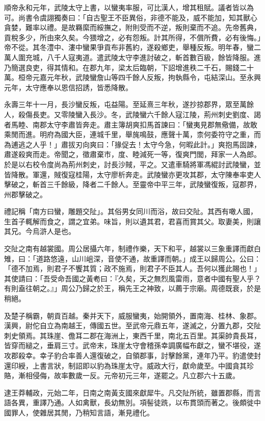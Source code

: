 \begin{pinyinscope}
順帝永和元年，武陵太守上書，以蠻夷率服，可比漢人，增其租賦。議者皆以為可。尚書令虞詡獨奏曰：「自古聖王不臣異俗，非德不能及，威不能加，知其獸心貪婪，難率以禮。是故羇縻而綏撫之，附則受而不逆，叛則棄而不追。先帝舊典，貢稅多少，所由來久矣。今猥增之，必有怨叛。計其所得，不償所費，必有後悔。」帝不從。其冬澧中、漊中蠻果爭貢布非舊約，遂殺鄉吏，舉種反叛。明年春，蠻二萬人圍充城，八千人寇夷道。遣武陵太守李進討破之，斬首數百級，餘皆降服。進乃簡選良吏，得其情和。在郡九年，梁太后臨朝，下詔增進秩二千石，賜錢二十萬。桓帝元嘉元年秋，武陵蠻詹山等四千餘人反叛，拘執縣令，屯結深山。至永興元年，太守應奉以恩信招誘，皆悉降散。

永壽三年十一月，長沙蠻反叛，屯益陽。至延熹三年秋，遂抄掠郡界，眾至萬餘人，殺傷長吏。又零陵蠻入長沙。冬，武陵蠻六千餘人寇江陵，荊州刺史劉度、謁者馬睦、南郡太守李肅皆奔走。肅主簿胡爽扣馬首諫曰：「蠻夷見郡無儆備，故敢乘閒而進。明府為國大臣，連城千里，舉旄鳴鼓，應聲十萬，柰何委符守之重，而為逋逃之人乎！」肅拔刃向爽曰：「掾促去！太守今急，何暇此計。」爽抱馬固諫，肅遂殺爽而走。帝聞之，徵肅棄巿，度、睦減死一等，復爽門閭，拜家一人為郎。於是以右校令度尚為荊州刺史，討長沙賊，平之。又遣車騎將軍馮緄討武陵蠻，並皆降散。軍還，賊復寇桂陽，太守廖析奔走。武陵蠻亦更攻其郡，太守陳奉率吏人擊破之，斬首三千餘級，降者二千餘人。至靈帝中平三年，武陵蠻復叛，寇郡界，州郡擊破之。

禮記稱「南方曰蠻，雕題交阯」。其俗男女同川而浴，故曰交阯。其西有噉人國，生首子輒解而食之，謂之宜弟。味旨，則以遺其君，君喜而賞其父。取妻美，則讓其兄。今烏滸人是也。

交阯之南有越裳國。周公居攝六年，制禮作樂，天下和平，越裳以三象重譯而獻白雉，曰：「道路悠遠，山川岨深，音使不通，故重譯而朝。」成王以歸周公。公曰：「德不加焉，則君子不饗其質；政不施焉，則君子不臣其人。吾何以獲此賜也！」其使請曰：「吾受命吾國之黃耇曰：『久矣，天之無烈風雷雨，意者中國有聖人乎？有則盍往朝之。』」周公乃歸之於王，稱先王之神致，以薦于宗廟。周德既衰，於是稍絕。

及楚子稱霸，朝貢百越。秦并天下，威服蠻夷，始開領外，置南海、桂林、象郡。漢興，尉佗自立為南越王，傳國五世。至武帝元鼎五年，遂滅之，分置九郡，交阯刺史領焉。其珠崖、儋耳二郡在海洲上，東西千里，南北五百里。其渠帥貴長耳，皆穿而縋之，垂肩三寸。武帝末，珠崖太守會稽孫幸調廣幅布獻之，蠻不堪役，遂攻郡殺幸。幸子豹合率善人還復破之，自領郡事，討擊餘黨，連年乃平。豹遣使封還印綬，上書言狀，制詔即以豹為珠崖太守。威政大行，獻命歲至。中國貪其珍賂，漸相侵侮，故率數歲一反。元帝初元三年，遂罷之。凡立郡六十五歲。

逮王莽輔政，元始二年，日南之南黃支國來獻犀牛。凡交阯所統，雖置郡縣，而言語各異，重譯乃通。人如禽獸，長幼無別。項髻徒跣，以布貫頭而著之。後頗徙中國罪人，使雜居其閒，乃稍知言語，漸見禮化。


\end{pinyinscope}
